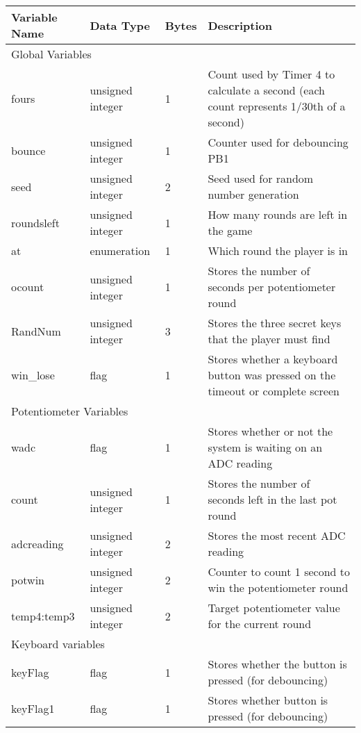 \documentclass[a4paper]{article}
\begin{document}
\begin{table}[H]
	\centering
	\label{tbl:dict}
	\begin{tabular}{@{}lllp{9cm}@{}}
		\toprule
		Variable Name & Data Type        & Bytes & Description \\ \midrule
		\multicolumn{4}{l}{Global Variables} \\ \midrule
		fours         & unsigned integer & 1     & Count used by Timer 4 to calculate a second (each count represents 1/30th of a second) \\
		bounce        & unsigned integer & 1     & Counter used for debouncing PB1 \\
		seed          & unsigned integer & 2     & Seed used for random number generation \\
		roundsleft    & unsigned integer & 1     & How many rounds are left in the game \\
		at            & enumeration      & 1     & Which round the player is in \\
		ocount        & unsigned integer & 1     & Stores the number of seconds per potentiometer round \\
		RandNum		  & unsigned integer & 3	& Stores the three secret keys that the player must find\\
		win\_lose 	  & flag 			 & 1	 & Stores whether a keyboard button was pressed on the timeout or complete screen\\ \midrule
		\multicolumn{4}{l}{Potentiometer Variables} \\ \midrule
		wadc          & flag             & 1     & Stores whether or not the system is waiting on an ADC reading \\
		count         & unsigned integer & 1     & Stores the number of seconds left in the last pot round \\
		adcreading	& unsigned integer	& 2 & Stores the most recent ADC reading \\  
		potwin		& unsigned integer	& 2	& Counter to count 1 second to win the potentiometer round \\ 
		temp4:temp3	& unsigned integer	& 2	& Target potentiometer value for the current round \\ \midrule
		\multicolumn{4}{l}{Keyboard variables} \\ \midrule
		keyFlag 	 & flag				& 1 & Stores whether the button is pressed (for debouncing)\\
		keyFlag1	 & flag				& 1 & Stores whether button is pressed (for debouncing) \\ 

\end{tabular}
\end{table}
\end{document}
